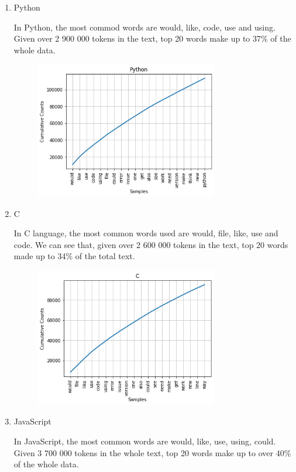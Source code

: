 \documentclass[]{article}
\begin{document}
\begin{enumerate}

\item Python

In Python, the most commod words are would, like, code, use and using. Given over 2 900 000 tokens in the text, top 20 words make up to 37\% of the whole data.

                        \begin{figure}[H]
    \includegraphics[width=8cm]{resources/freq_Python.png}
    \centering
    \end{figure}
    
    \item C
    
    In C language, the most common words used are would, file, like, use and code. We can see that, given over 2 600 000 tokens in the text, top 20 words made up to 34\% of the total text. 
    
                        \begin{figure}[H]
    \includegraphics[width=8cm]{resources/freq_C.png}
    \centering
    \end{figure}
    
    \item JavaScript
    
    In JavaScript, the most common words are would, like, use, using, could. Given 3 700 000 tokens in the whole text, top 20 words make up to over 40\% of the whole data.
    

\end{enumerate}
\end{document}
